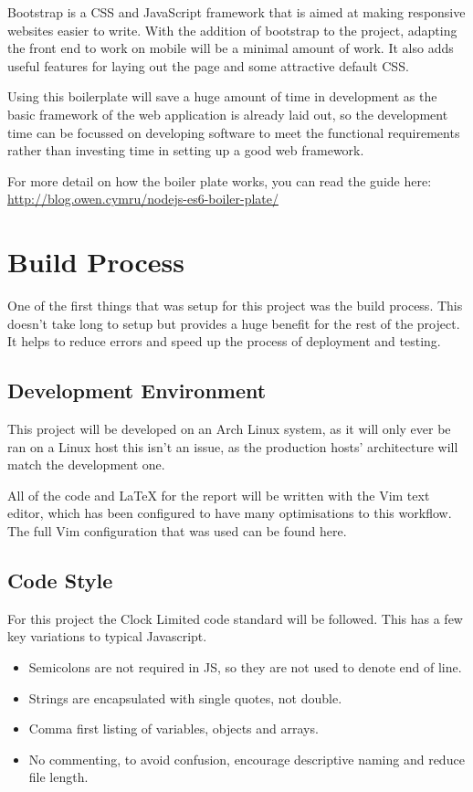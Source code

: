     Bootstrap is a CSS and JavaScript framework that is aimed at making responsive websites easier to write. With the addition of bootstrap to the project, adapting the front end to work on mobile will be a minimal amount of work. It also adds useful features for laying out the page and some attractive default CSS. 

Using this boilerplate will save a huge amount of time in development as the basic framework of the web application is already laid out, so the development time can be focussed on developing software to meet the functional requirements rather than investing time in setting up a good web framework. 

For more detail on how the boiler plate works, you can read the guide here: \url{http://blog.owen.cymru/nodejs-es6-boiler-plate/}

\section{Build Process}
  One of the first things that was setup for this project was the build process. This doesn't take long to setup but provides a huge benefit for the rest of the project. It helps to reduce errors and speed up the process of deployment and testing.

  \subsection{Development Environment}
    This project will be developed on an Arch Linux system, as it will only ever be ran on a Linux host this isn't an issue, as the production hosts' architecture will match the development one. 

    All of the code and LaTeX for the report will be written with the Vim text editor, which has been configured to have many optimisations to this workflow. The full Vim configuration that was used can be found here\cite{vimrc}.

  \subsection{Code Style}
  For this project the Clock Limited code standard\cite{clockstandard} will be followed. This has a few key variations to typical Javascript. 

  \begin{itemize}
    \item Semicolons are not required in JS, so they are not used to denote end of line.
    \item Strings are encapsulated with single quotes, not double. 
    \item Comma first\cite{commafirst} listing of variables, objects and arrays.
    \item No commenting, to avoid confusion, encourage descriptive naming and reduce file length.
  \end{itemize}

